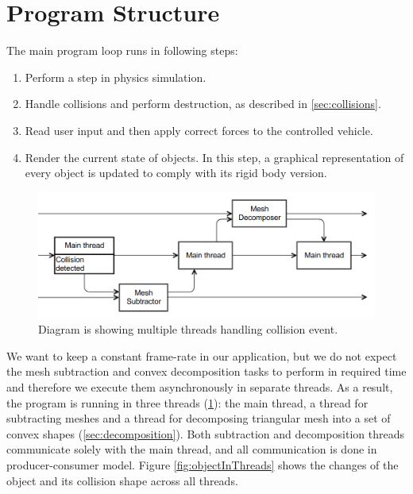 \section{Program Structure}
The main program loop runs in following steps:
\begin{enumerate}
\item Perform a step in physics simulation.
\item Handle collisions and perform destruction, as described in  \cref{sec:collisions}.
\item Read user input and then apply correct forces to the controlled vehicle.
\item Render the current state of objects. In this step, a graphical representation of every object is updated to comply with its rigid body version.
\end{enumerate}

\begin{figure}
        \centering
        \includegraphics[width=\textwidth]{img/decompositionFlow}
        \caption{Diagram is showing multiple threads handling collision event. }
        \label{fig:threads}
\end{figure}

We want to keep a constant frame-rate in our application, but we do not  expect the mesh subtraction and convex decomposition tasks to perform in required time and therefore we execute them asynchronously in separate threads. As a result, the program is running in three threads (\cref{fig:threads}): the main thread, a thread for subtracting meshes and a thread for decomposing triangular mesh into a set of convex shapes (\cref{sec:decomposition}). Both subtraction and decomposition threads communicate solely with the main thread, and all communication is done in producer-consumer model. Figure \ref{fig:objectInThreads} shows the changes of the object and its collision shape across all threads.

